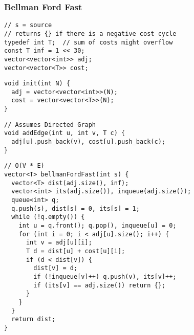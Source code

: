 \documentclass[twoside]{article}
\newcommand{\fileTitleStyle}{\large\underline}
\begin{document}
\begin{multicols*}{2}
\subsubsection*{Bellman Ford Fast}
\begin{verbatim}
// s = source
// returns {} if there is a negative cost cycle
typedef int T;  // sum of costs might overflow
const T inf = 1 << 30;
vector<vector<int>> adj;
vector<vector<T>> cost;
\end{verbatim}
\vspace{-12pt}
\begin{verbatim}
void init(int N) {
  adj = vector<vector<int>>(N);
  cost = vector<vector<T>>(N);
}
\end{verbatim}
\vspace{-12pt}
\begin{verbatim}
// Assumes Directed Graph
void addEdge(int u, int v, T c) {
  adj[u].push_back(v), cost[u].push_back(c);
}
\end{verbatim}
\vspace{-12pt}
\begin{verbatim}
// O(V * E)
vector<T> bellmanFordFast(int s) {
  vector<T> dist(adj.size(), inf);
  vector<int> its(adj.size()), inqueue(adj.size());
  queue<int> q;
  q.push(s), dist[s] = 0, its[s] = 1;
  while (!q.empty()) {
    int u = q.front(); q.pop(), inqueue[u] = 0;
    for (int i = 0; i < adj[u].size(); i++) {
      int v = adj[u][i];
      T d = dist[u] + cost[u][i];
      if (d < dist[v]) {
        dist[v] = d;
        if (!inqueue[v]++) q.push(v), its[v]++;
        if (its[v] == adj.size()) return {};
      }
    }
  }
  return dist;
}
\end{verbatim}

\subsubsectionfont{\centering\bfseries\Large}
\subsubsectionfont{\fileTitleStyle}

\end{multicols*}
\end{document}
